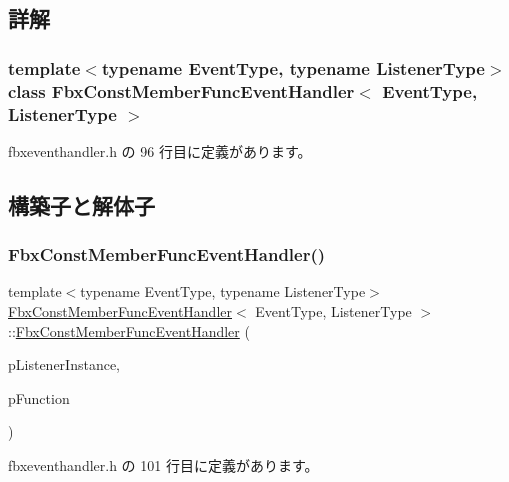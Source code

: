 \subsection{詳解}
\subsubsection*{template$<$typename Event\+Type, typename Listener\+Type$>$\newline
class Fbx\+Const\+Member\+Func\+Event\+Handler$<$ Event\+Type, Listener\+Type $>$}



 fbxeventhandler.\+h の 96 行目に定義があります。



\subsection{構築子と解体子}
\mbox{\label{class_fbx_const_member_func_event_handler_ae3bd1e1775d0126faa06efe6ffda1211}} 
\subsubsection{\texorpdfstring{Fbx\+Const\+Member\+Func\+Event\+Handler()}{FbxConstMemberFuncEventHandler()}}
{\footnotesize\ttfamily template$<$typename Event\+Type, typename Listener\+Type$>$ \\
\hyperlink{class_fbx_const_member_func_event_handler}{Fbx\+Const\+Member\+Func\+Event\+Handler}$<$ Event\+Type, Listener\+Type $>$\+::\hyperlink{class_fbx_const_member_func_event_handler}{Fbx\+Const\+Member\+Func\+Event\+Handler} (\begin{DoxyParamCaption}\item[{Listener\+Type $\ast$}]{p\+Listener\+Instance,  }\item[{Callback\+Fnc}]{p\+Function }\end{DoxyParamCaption})\hspace{0.3cm}{\ttfamily [inline]}}



 fbxeventhandler.\+h の 101 行目に定義があります。




